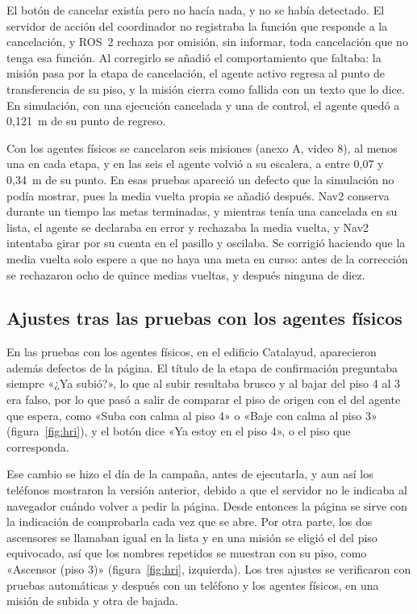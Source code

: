 El botón de cancelar existía pero no hacía nada, y no se había detectado. El servidor de acción del coordinador no registraba la función que responde a la cancelación, y ROS~2 rechaza por omisión, sin informar, toda
cancelación que no tenga esa función. Al corregirlo se añadió el comportamiento que faltaba: la misión pasa por la etapa de cancelación, el agente activo regresa al punto de transferencia de su piso, y la misión cierra como
fallida con un texto que lo dice. En simulación, con una ejecución cancelada y una de control, el agente quedó a 0,121~m de su punto de regreso.

Con los agentes físicos se cancelaron seis misiones (anexo A, video 8), al menos una en cada etapa, y en las seis el agente volvió a su escalera, a entre 0,07 y 0,34~m de su punto. En esas pruebas apareció un defecto que la simulación no podía mostrar, pues la media vuelta propia se añadió después. Nav2 conserva durante un tiempo las metas terminadas, y mientras tenía una cancelada en su lista, el agente se declaraba en error y rechazaba la
media vuelta, y Nav2 intentaba girar por su cuenta en el pasillo y oscilaba. Se corrigió haciendo que la media vuelta solo espere a que no haya una meta en curso: antes de la corrección se rechazaron ocho de quince
medias vueltas, y después ninguna de diez.

\subsection{Ajustes tras las pruebas con los agentes físicos}
\label{sec:ajustes-campo}

En las pruebas con los agentes físicos, en el edificio Catalayud, aparecieron además defectos de la página. El título de la etapa de confirmación preguntaba siempre «¿Ya subió?», lo que al subir resultaba brusco y al bajar del piso 4 al 3 era falso, por
lo que pasó a salir de comparar el piso de origen con el del agente que espera, como «Suba con calma al piso 4» o «Baje con calma al piso 3» (figura~\ref{fig:hri}), y el botón dice «Ya estoy en el piso 4», o el piso que
corresponda.

Ese cambio se hizo el día de la campaña, antes de ejecutarla, y aun así los teléfonos mostraron la versión anterior, debido a que el servidor no le indicaba al navegador cuándo volver a pedir la página. Desde entonces la
página se sirve con la indicación de comprobarla cada vez que se abre. Por otra parte, los dos ascensores se llamaban igual en la lista y en una misión se eligió el del piso equivocado, así que los nombres repetidos se
muestran con su piso, como «Ascensor (piso 3)» (figura~\ref{fig:hri}, izquierda). Los tres ajustes se verificaron con pruebas automáticas y después con un teléfono y los agentes físicos, en una misión de subida y otra de
bajada.

